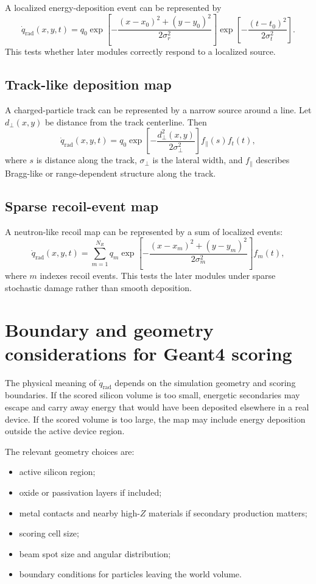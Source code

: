 \documentclass[11pt]{article}
\newcommand{\qrad}{\dot{q}_{\mathrm{rad}}}
\begin{document}
A localized energy-deposition event can be represented by
\begin{equation}
\qrad(x,y,t)
=
q_0
\exp\left[-\frac{(x-x_0)^2+(y-y_0)^2}{2\sigma_r^2}\right]
\exp\left[-\frac{(t-t_0)^2}{2\sigma_t^2}\right].
\end{equation}
This tests whether later modules correctly respond to a localized source.

\subsection{Track-like deposition map}

A charged-particle track can be represented by a narrow source around a line. Let $d_\perp(x,y)$ be distance from the track centerline. Then
\begin{equation}
\qrad(x,y,t)
=
q_0\exp\left[-\frac{d_\perp^2(x,y)}{2\sigma_\perp^2}\right]f_{\parallel}(s)f_t(t),
\end{equation}
where $s$ is distance along the track, $\sigma_\perp$ is the lateral width, and $f_{\parallel}$ describes Bragg-like or range-dependent structure along the track.

\subsection{Sparse recoil-event map}

A neutron-like recoil map can be represented by a sum of localized events:
\begin{equation}
\qrad(x,y,t)
=
\sum_{m=1}^{N_R} q_m
\exp\left[-\frac{(x-x_m)^2+(y-y_m)^2}{2\sigma_m^2}\right]f_m(t),
\end{equation}
where $m$ indexes recoil events. This tests the later modules under sparse stochastic damage rather than smooth deposition.

\section{Boundary and geometry considerations for Geant4 scoring}

The physical meaning of $\qrad$ depends on the simulation geometry and scoring boundaries. If the scored silicon volume is too small, energetic secondaries may escape and carry away energy that would have been deposited elsewhere in a real device. If the scored volume is too large, the map may include energy deposition outside the active device region.

The relevant geometry choices are:
\begin{itemize}
\item active silicon region;
\item oxide or passivation layers if included;
\item metal contacts and nearby high-$Z$ materials if secondary production matters;
\item scoring cell size;
\item beam spot size and angular distribution;
\item boundary conditions for particles leaving the world volume.
\end{itemize}
\end{document}
